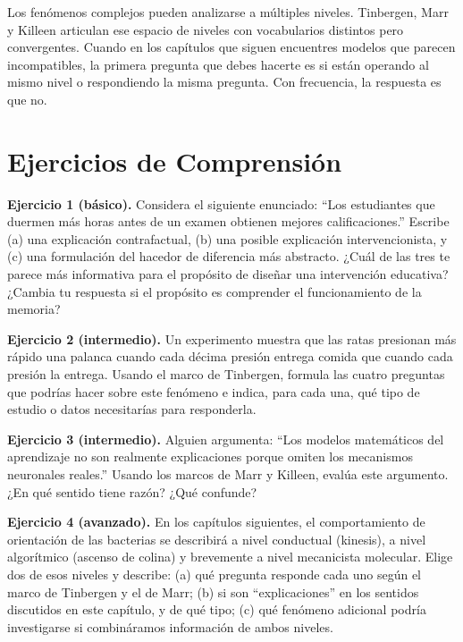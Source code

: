 \documentclass[
  letterpaper,
  DIV=11,
  numbers=noendperiod]{scrreprt}
\begin{document}
Los fenómenos complejos pueden analizarse a múltiples niveles.
Tinbergen, Marr y Killeen articulan ese espacio de niveles con
vocabularios distintos pero convergentes. Cuando en los capítulos que
siguen encuentres modelos que parecen incompatibles, la primera pregunta
que debes hacerte es si están operando al mismo nivel o respondiendo la
misma pregunta. Con frecuencia, la respuesta es que no.

\section{Ejercicios de Comprensión}\label{ejercicios-de-comprensiuxf3n}

\textbf{Ejercicio 1 (básico).} Considera el siguiente enunciado: ``Los
estudiantes que duermen más horas antes de un examen obtienen mejores
calificaciones.'' Escribe (a) una explicación contrafactual, (b) una
posible explicación intervencionista, y (c) una formulación del hacedor
de diferencia más abstracto. ¿Cuál de las tres te parece más informativa
para el propósito de diseñar una intervención educativa? ¿Cambia tu
respuesta si el propósito es comprender el funcionamiento de la memoria?

\textbf{Ejercicio 2 (intermedio).} Un experimento muestra que las ratas
presionan más rápido una palanca cuando cada décima presión entrega
comida que cuando cada presión la entrega. Usando el marco de Tinbergen,
formula las cuatro preguntas que podrías hacer sobre este fenómeno e
indica, para cada una, qué tipo de estudio o datos necesitarías para
responderla.

\textbf{Ejercicio 3 (intermedio).} Alguien argumenta: ``Los modelos
matemáticos del aprendizaje no son realmente explicaciones porque omiten
los mecanismos neuronales reales.'' Usando los marcos de Marr y Killeen,
evalúa este argumento. ¿En qué sentido tiene razón? ¿Qué confunde?

\textbf{Ejercicio 4 (avanzado).} En los capítulos siguientes, el
comportamiento de orientación de las bacterias se describirá a nivel
conductual (kinesis), a nivel algorítmico (ascenso de colina) y
brevemente a nivel mecanicista molecular. Elige dos de esos niveles y
describe: (a) qué pregunta responde cada uno según el marco de Tinbergen
y el de Marr; (b) si son ``explicaciones'' en los sentidos discutidos en
este capítulo, y de qué tipo; (c) qué fenómeno adicional podría
investigarse si combináramos información de ambos niveles.

\end{document}
